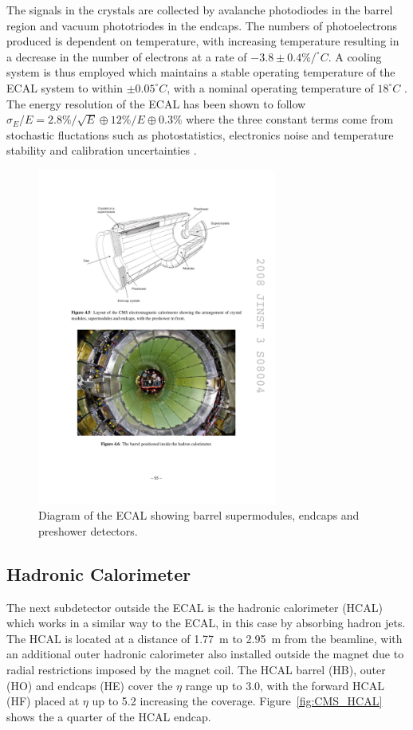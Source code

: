The signals in the crystals are collected by avalanche photodiodes in the barrel region and vacuum
phototriodes in the endcaps. The numbers of photoelectrons produced is dependent on temperature, with
increasing temperature resulting in a decrease in the number of electrons at a rate of
$-3.8\pm0.4\%/^{\circ}C$. A cooling system is thus employed which maintains a stable operating temperature of
the ECAL system to within $\pm0.05^{\circ}C$, with a nominal operating temperature of $18^{\circ}C$
\cite{CMS_experiment}. The energy resolution of the ECAL has been shown to follow $\sigma_{E}/E =
2.8\%/\sqrt{E}\oplus 12\%/E \oplus 0.3\%$ where the three constant terms come from stochastic fluctations such
as photostatistics, electronics noise and temperature stability and calibration uncertainties
\cite{ECAL_calibration_and_resolution_at_7TeV}.

\begin{figure}[hbtp]
   \centering
     \includegraphics[width=0.7\textwidth]{Chapters/02_Detector/Images/ECAL.pdf}\hfill
     \caption{Diagram of the ECAL showing barrel supermodules, endcaps and preshower detectors.
     \cite{ECAL_calibration_and_resolution_at_7TeV}}
     \label{fig:CMS_ECAL}
\end{figure}

\subsection{Hadronic Calorimeter}
\label{ss:Hcal}
The next subdetector outside the ECAL is the hadronic calorimeter (HCAL) which works in a similar way to
the ECAL, in this case by absorbing hadron jets. The HCAL is located at a distance of 1.77~m to 2.95~m from
the beamline, with an additional outer hadronic calorimeter also installed outside the magnet due to
radial restrictions imposed by the magnet coil. The HCAL barrel (HB), outer (HO) and endcaps (HE) cover
the $\eta$ range up to 3.0, with the forward HCAL (HF) placed at $\eta$ up to 5.2 increasing the coverage.
Figure~\ref{fig:CMS_HCAL} shows the a quarter of the HCAL endcap.


